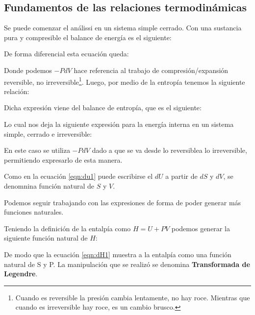 \subsection{Fundamentos de las relaciones termodinámicas}

Se puede comenzar el análissi en un sistema simple cerrado. Con una sustancia pura y compresible el balance de energía es el siguiente:


De forma diferencial esta ecuación queda:


Donde podemos $-PdV$ hace referencia al trabajo de compresión/expansión reversible, no irreversible\footnote{Cuando es reversible la presión cambia lentamente, no hay roce. Mientras que cuando es irreversible hay roce, es un cambio brusco.}. Luego, por medio de la entropía tenemos la siguiente relación:


Dicha expresión viene del balance de entropía, que es el siguiente:


Lo cual nos deja la siguiente expresión para la energía interna en un sistema simple, cerrado e irreversible:

\insertequation[\label{eqn:du1}]{ dU=TdS -PdV}{}

En este caso se utiliza $-PdV$ dado a que se va desde lo reversiblea lo irreversible, permitiendo expresarlo de esta manera.

Como en la ecuación \ref{eqn:du1} puede escribirse el $dU$ a partir de $dS$ y $dV$, se denomnina función natural de $S$ y $V$. 

Podemos seguir trabajando con las expresiones de forma de poder generar más funciones naturales.

Teniendo la definición de la entalpía como $H=U+PV$ podemos generar la siguiente función natural de $H$:


De modo que la ecuación \ref{eqn:dH1} muestra a la entalpía como una función natural de S y P. La manipulación que se realizó se denomina \textbf{Transformada de Legendre}.

